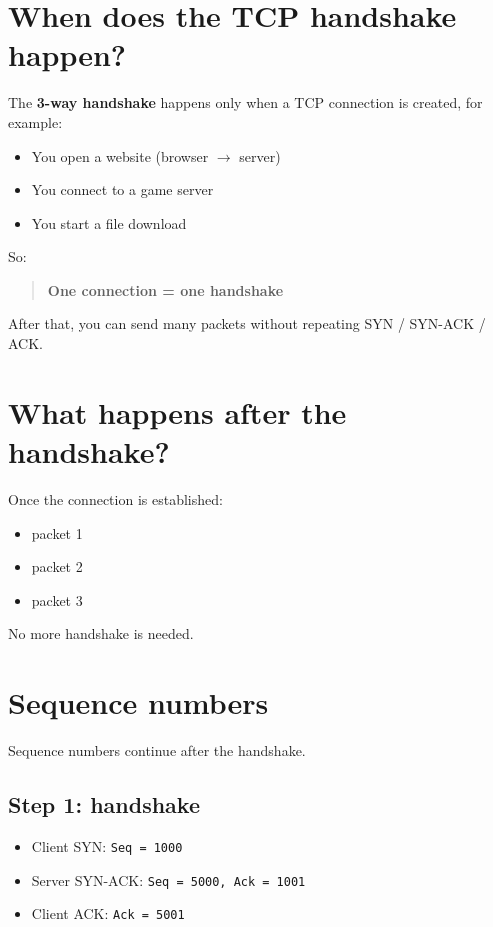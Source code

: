 \section{When does the TCP handshake happen?}

The \textbf{3-way handshake} happens only when a TCP connection is created, for example:

\begin{itemize}
    \item You open a website (browser $\rightarrow$ server)
    \item You connect to a game server
    \item You start a file download
\end{itemize}

So:

\begin{quote}
\textbf{One connection = one handshake}
\end{quote}

After that, you can send many packets without repeating SYN / SYN-ACK / ACK.

\section{What happens after the handshake?}

Once the connection is established:

\begin{itemize}
    \item packet 1
    \item packet 2
    \item packet 3
\end{itemize}

No more handshake is needed.

\section{Sequence numbers}

Sequence numbers continue after the handshake.

\subsection{Step 1: handshake}

\begin{itemize}
    \item Client SYN: \texttt{Seq = 1000}
    \item Server SYN-ACK: \texttt{Seq = 5000, Ack = 1001}
    \item Client ACK: \texttt{Ack = 5001}
\end{itemize}

